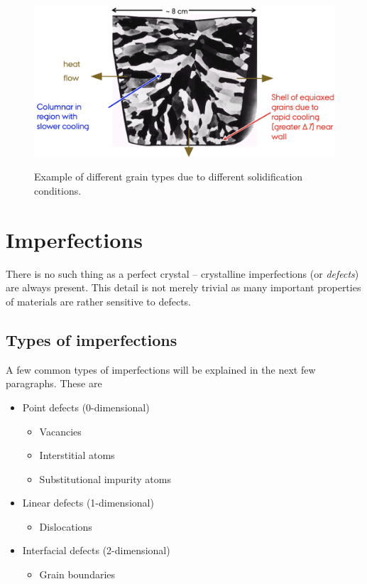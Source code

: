 \begin{figure} [ht]
  \centering
  \caption{Example of different grain types due to different solidification conditions.}
  \includegraphics[width=0.65\linewidth]{./figures/f4_2.png}
  \label{fig:f4_2}
\end{figure}

\section{Imperfections}
There is no such thing as a perfect crystal -- crystalline imperfections (or \textit{defects}) are always present. This detail is not merely trivial as many important properties of materials are rather sensitive to defects. 

\subsection{Types of imperfections}
A few common types of imperfections will be explained in the next few paragraphs. These are
\begin{itemize}
  \item Point defects (0-dimensional)
    \begin{itemize}
      \item Vacancies
      \item Interstitial atoms
      \item Substitutional impurity atoms
    \end{itemize}
  \item Linear defects (1-dimensional)
    \begin{itemize}
      \item Dislocations
    \end{itemize}
  \item Interfacial defects (2-dimensional)
    \begin{itemize}
      \item Grain boundaries
    \end{itemize}
\end{itemize}

